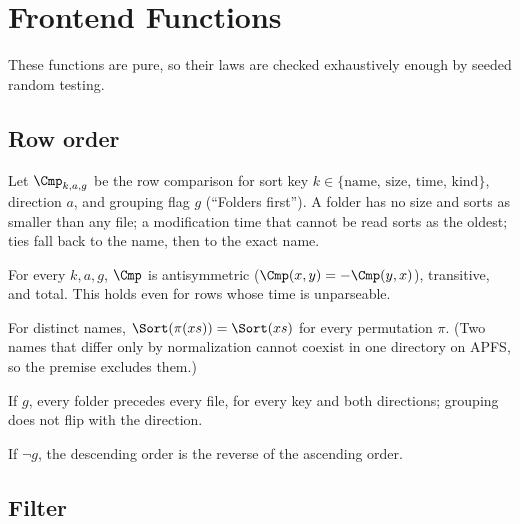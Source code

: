 \section{Frontend Functions}
\label{sec:frontend}

These functions are pure, so their laws are checked exhaustively enough by
seeded random testing.

\subsection{Row order}

Let $\Cmp_{k,a,g}$ be the row comparison for sort key $k\in\{\text{name, size,
time, kind}\}$, direction $a$, and grouping flag $g$ (``Folders first'').  A
folder has no size and sorts as smaller than any file; a modification time that
cannot be read sorts as the oldest; ties fall back to the name, then to the
exact name.

\begin{law}
\label{law:total}
For every $k,a,g$, $\Cmp$ is antisymmetric
($\Cmp(x,y)=-\Cmp(y,x)$), transitive, and total.  This holds even for rows whose
time is unparseable.
\end{law}

\begin{law}
\label{law:input-order}
For distinct names, $\Sort(\pi(xs))=\Sort(xs)$ for every permutation $\pi$.
(Two names that differ only by normalization cannot coexist in one directory on
APFS, so the premise excludes them.)
\end{law}

\begin{law}[Grouping]
\label{law:grouping}
If $g$, every folder precedes every file, for every key and both directions;
grouping does not flip with the direction.
\end{law}

\begin{law}[Reversal]
\label{law:reversal}
If $\neg g$, the descending order is the reverse of the ascending order.
\end{law}

\subsection{Filter}

